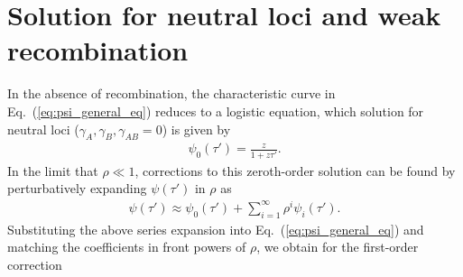 \documentclass[aps,rmp,twocolumn,groupedaddress,floatfix,notitlepage]{revtex4-1}
\begin{document}
\section{Solution for neutral loci and weak recombination}
\label{appendix:neutral-loci}

In the absence of recombination, the characteristic curve in Eq.~(\ref{eq:psi_general_eq}) reduces to a logistic equation, which solution for neutral loci ($\gamma_A, \gamma_B, \gamma_{AB} = 0$) is given by
\begin{align}
    \psi_0(\tau') = \frac{z}{1+z\tau'}.
\end{align}
In the limit that $\rho \ll 1$, corrections to this zeroth-order solution can be found by perturbatively expanding $\psi(\tau')$ in $\rho$ as
\begin{align}\label{eq:z_series}
    \psi(\tau') \approx \psi_0(\tau') + \sum_{i=1}^{\infty} \rho^{i}\psi_i(\tau').
\end{align}
Substituting the above series expansion into Eq.~(\ref{eq:psi_general_eq}) and matching the coefficients in front powers of $\rho$, we obtain for the first-order correction
\end{document}
